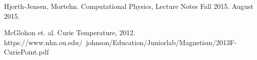 \documentclass[%
oneside,                 %
final,                   %
10pt]{article}
\begin{document}
\begin{thebibliography}{9}

Hjorth-Jensen, Mortehn. 
Computational Physics, Lecture Notes Fall 2015. 
August 2015.

McGlohon et. al.
Curie Temperature, 2012.
https://www.nhn.ou.edu/~johnson/Education/Juniorlab/Magnetism/2013F-CuriePoint.pdf

\end{thebibliography}



\end{document}
